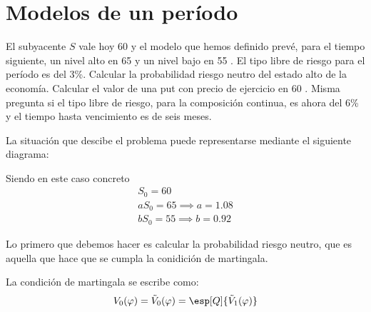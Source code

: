 \section{Modelos de un período}
\begin{problem}[1]
El subyacente $S$ vale hoy 60 \texteuro y el modelo que hemos definido prevé, para el tiempo siguiente, un nivel alto en 65 \texteuro y un nivel bajo en 55 \texteuro. El tipo libre de riesgo para el período es del 3\%.
\ppart Calcular la probabilidad riesgo neutro del estado alto de la economía.
\ppart Calcular el valor de una put con precio de ejercicio en 60 \texteuro.
\ppart Misma pregunta si el tipo libre de riesgo, para la composición continua, es ahora del 6\% y el tiempo hasta vencimiento es de seis meses.

\solution

\spart

La situación que descibe el problema puede representarse mediante el siguiente diagrama:

\begin{minipage}{0.48\textwidth}
\begin{center}
\end{center}
\end{minipage}
\begin{minipage}{0.48\textwidth}
Siendo en este caso concreto
\[\begin{array}{l}
S_0 = 60 \\
aS_0 = 65 \implies a = 1.08 \\
bS_0 = 55 \implies b = 0.92
\end{array}\]
\end{minipage}

Lo primero que debemos hacer es calcular la probabilidad riesgo neutro, que es aquella que hace que se cumpla la conidición de martingala.

La condición de martingala se escribe como:
\[V_0(\varphi) = \tilde{V}_0(\varphi) = \esp[Q]{\tilde{V}_1(\varphi)}\]


\end{problem}
